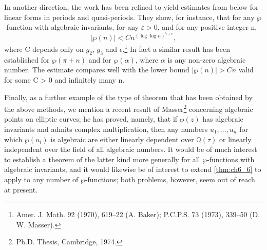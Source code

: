 In another direction, the work has been refined to yield estimates from below for linear forms in periods and quasi-periods. They show, for instance, that for any $\wp$-function with algebraic invariants, for any $\varepsilon > 0$, and for any positive integer n,
\[|\wp(n)| < C n^{(\log \log n)^{7+\epsilon}},\]
where C depends only on $g_2$, $g_3$ and $\epsilon$.\footnote{Amer. J. Math. 92 (1970), 619--22 (A. Baker); P.C.P.S. 73 (1973), 339--50 (D. W. Masser).} In fact a similar result has been established for $\wp(\pi+n)$ and for $\wp(\alpha)$, where $\alpha$ is any non-zero algebraic number. The estimate compares well with the lower bound $|\wp(n)| > Cn$ valid for some C > 0 and infinitely many n.

Finally, as a further example of the type of theorem that has been obtained by the above methods, we mention a recent result of Masser\footnote{Ph.D. Thesis, Cambridge, 1974.} concerning algebraic points on elliptic curves; he has proved, namely, that if $\wp(z)$ has algebraic invariants and admits complex multiplication, then any numbers $u_1, \ldots, u_n$ for which $\wp(u_i)$ is algebraic are either linearly dependent over $\mathbb{Q}(\tau)$ or linearly independent over the field of all algebraic numbers. It would be of much interest to establish a theorem of the latter kind more generally for all $\wp$-functions with algebraic invariants, and it would likewise be of interest to extend \autoref{thm:ch6_6} to apply to any number of $\wp$-functions; both problems, however, seem out of reach at present.
